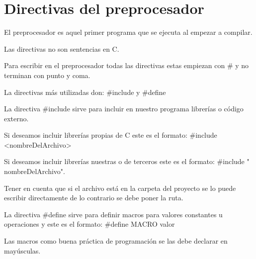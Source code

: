 \section [Directivas del preprocesador]{Directivas del preprocesador}
El preprocesador es aquel primer programa que se ejecuta al empezar a compilar.

\vspace{1em}
Las directivas no son sentencias en C.

\vspace{1em}
Para escribir en el preprocesador todas las directivas estas empiezan con \# y no terminan con punto y coma.

\vspace{1em}
{La directivas más utilizadas don: \#include y \#define}

\vspace{1em}
{La directiva \#include sirve para incluir en nuestro programa librerías o código externo.}

\vspace{1em}
{Si deseamos incluir librerías propias de C este es el formato: \#include <nombreDelArchivo>}

\vspace{1em}
{Si deseamos incluir librerías nuestras o de terceros este es el formato: \#include " nombreDelArchivo".}

Tener en cuenta que si el archivo está en la carpeta del proyecto se lo puede escribir directamente de lo contrario se debe poner la ruta.

\vspace{1em}
{La directiva \#define sirve para definir macros para valores constantes u operaciones y este es el formato: \#define MACRO valor}

\vspace{1em}
{Las macros como buena práctica de programación se las debe declarar en mayúsculas.}
